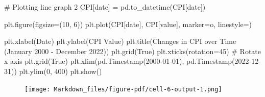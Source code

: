 \documentclass[
  letterpaper,
  DIV=11,
  numbers=noendperiod]{scrartcl}
\newenvironment{Shaded}{\begin{snugshade}}{\end{snugshade}}
\newcommand{\CommentTok}[1]{\textcolor[rgb]{0.37,0.37,0.37}{#1}}
\newcommand{\DecValTok}[1]{\textcolor[rgb]{0.68,0.00,0.00}{#1}}
\newcommand{\NormalTok}[1]{\textcolor[rgb]{0.00,0.23,0.31}{#1}}
\newcommand{\OperatorTok}[1]{\textcolor[rgb]{0.37,0.37,0.37}{#1}}
\newcommand{\StringTok}[1]{\textcolor[rgb]{0.13,0.47,0.30}{#1}}
\newcommand{\VariableTok}[1]{\textcolor[rgb]{0.07,0.07,0.07}{#1}}
\begin{document}
\begin{Shaded}
\begin{Highlighting}[]
\CommentTok{\# Plotting line graph 2 }
\NormalTok{CPI[}\StringTok{\textquotesingle{}date\textquotesingle{}}\NormalTok{] }\OperatorTok{=}\NormalTok{ pd.to\_datetime(CPI[}\StringTok{\textquotesingle{}date\textquotesingle{}}\NormalTok{])}

\NormalTok{plt.figure(figsize}\OperatorTok{=}\NormalTok{(}\DecValTok{10}\NormalTok{, }\DecValTok{6}\NormalTok{))}
\NormalTok{plt.plot(CPI[}\StringTok{\textquotesingle{}date\textquotesingle{}}\NormalTok{], CPI[}\StringTok{\textquotesingle{}value\textquotesingle{}}\NormalTok{], marker}\OperatorTok{=}\StringTok{\textquotesingle{}o\textquotesingle{}}\NormalTok{, linestyle}\OperatorTok{=}\StringTok{\textquotesingle{}{-}\textquotesingle{}}\NormalTok{)}

\NormalTok{plt.xlabel(}\StringTok{\textquotesingle{}Date\textquotesingle{}}\NormalTok{)}
\NormalTok{plt.ylabel(}\StringTok{\textquotesingle{}CPI Value\textquotesingle{}}\NormalTok{)}
\NormalTok{plt.title(}\StringTok{\textquotesingle{}Changes in CPI over Time (January 2000 {-} December 2022)\textquotesingle{}}\NormalTok{)}
\NormalTok{plt.grid(}\VariableTok{True}\NormalTok{)}
\NormalTok{plt.xticks(rotation}\OperatorTok{=}\DecValTok{45}\NormalTok{)  }\CommentTok{\# Rotate x axis}
\NormalTok{plt.grid(}\VariableTok{True}\NormalTok{)}
\NormalTok{plt.xlim(pd.Timestamp(}\StringTok{\textquotesingle{}2000{-}01{-}01\textquotesingle{}}\NormalTok{), pd.Timestamp(}\StringTok{\textquotesingle{}2022{-}12{-}31\textquotesingle{}}\NormalTok{))}
\NormalTok{plt.ylim(}\DecValTok{0}\NormalTok{, }\DecValTok{400}\NormalTok{)}
\NormalTok{plt.show()}
\end{Highlighting}
\end{Shaded}

\begin{figure}[H]

{\centering \texttt{[image: Markdown\_files/figure-pdf/cell-6-output-1.png]}

}

\end{figure}
\end{document}
